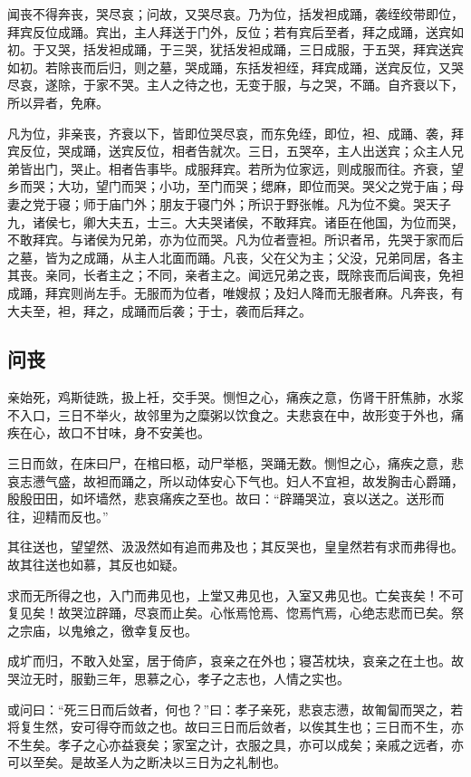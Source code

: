 \documentclass[]{article}
\begin{document}
闻丧不得奔丧，哭尽哀；问故，又哭尽哀。乃为位，括发袒成踊，袭绖绞带即位，拜宾反位成踊。宾出，主人拜送于门外，反位；若有宾后至者，拜之成踊，送宾如初。于又哭，括发袒成踊，于三哭，犹括发袒成踊，三日成服，于五哭，拜宾送宾如初。若除丧而后归，则之墓，哭成踊，东括发袒绖，拜宾成踊，送宾反位，又哭尽哀，遂除，于家不哭。主人之待之也，无变于服，与之哭，不踊。自齐衰以下，所以异者，免麻。

凡为位，非亲丧，齐衰以下，皆即位哭尽哀，而东免绖，即位，袒、成踊、袭，拜宾反位，哭成踊，送宾反位，相者告就次。三日，五哭卒，主人出送宾；众主人兄弟皆出门，哭止。相者告事毕。成服拜宾。若所为位家远，则成服而往。齐衰，望乡而哭；大功，望门而哭；小功，至门而哭；缌麻，即位而哭。哭父之党于庙；母妻之党于寝；师于庙门外；朋友于寝门外；所识于野张帷。凡为位不奠。哭天子九，诸侯七，卿大夫五，士三。大夫哭诸侯，不敢拜宾。诸臣在他国，为位而哭，不敢拜宾。与诸侯为兄弟，亦为位而哭。凡为位者壹袒。所识者吊，先哭于家而后之墓，皆为之成踊，从主人北面而踊。凡丧，父在父为主；父没，兄弟同居，各主其丧。亲同，长者主之；不同，亲者主之。闻远兄弟之丧，既除丧而后闻丧，免袒成踊，拜宾则尚左手。无服而为位者，唯嫂叔；及妇人降而无服者麻。凡奔丧，有大夫至，袒，拜之，成踊而后袭；于士，袭而后拜之。

\hypertarget{header-n780}{%
\subsection{问丧}\label{header-n780}}

亲始死，鸡斯徒跣，扱上衽，交手哭。恻怛之心，痛疾之意，伤肾干肝焦肺，水浆不入口，三日不举火，故邻里为之糜粥以饮食之。夫悲哀在中，故形变于外也，痛疾在心，故口不甘味，身不安美也。

三日而敛，在床曰尸，在棺曰柩，动尸举柩，哭踊无数。恻怛之心，痛疾之意，悲哀志懑气盛，故袒而踊之，所以动体安心下气也。妇人不宜袒，故发胸击心爵踊，殷殷田田，如坏墙然，悲哀痛疾之至也。故曰：``辟踊哭泣，哀以送之。送形而往，迎精而反也。''

其往送也，望望然、汲汲然如有追而弗及也；其反哭也，皇皇然若有求而弗得也。故其往送也如慕，其反也如疑。

求而无所得之也，入门而弗见也，上堂又弗见也，入室又弗见也。亡矣丧矣！不可复见矣！故哭泣辟踊，尽哀而止矣。心怅焉怆焉、惚焉忾焉，心绝志悲而已矣。祭之宗庙，以鬼飨之，徼幸复反也。

成圹而归，不敢入处室，居于倚庐，哀亲之在外也；寝苫枕块，哀亲之在土也。故哭泣无时，服勤三年，思慕之心，孝子之志也，人情之实也。

或问曰：``死三日而后敛者，何也？''曰：孝子亲死，悲哀志懑，故匍匐而哭之，若将复生然，安可得夺而敛之也。故曰三日而后敛者，以俟其生也；三日而不生，亦不生矣。孝子之心亦益衰矣；家室之计，衣服之具，亦可以成矣；亲戚之远者，亦可以至矣。是故圣人为之断决以三日为之礼制也。
\end{document}
